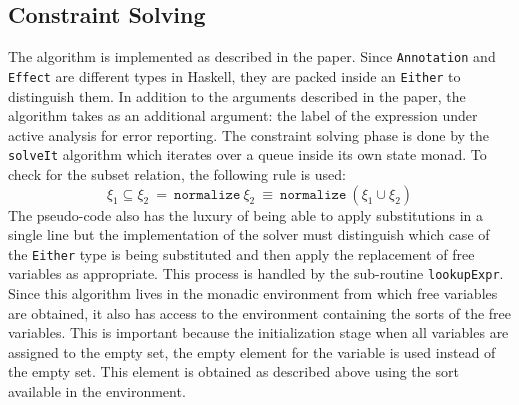 \documentclass[8pt]{extarticle}
\begin{document}
\subsection{Constraint Solving}
The algorithm is implemented as described in the paper. Since \verb+Annotation+ and \verb+Effect+ are different types in Haskell, they are packed inside an \verb+Either+ to distinguish them. In addition to the arguments described in the paper, the algorithm takes as an additional argument: the label of the expression under active analysis for error reporting. The constraint solving phase is done by the \verb+solveIt+ algorithm which iterates over a queue inside its own state monad. To check for the subset relation, the following rule is used:
\[
\xi_1\subseteq \xi_2\ =\ \mathtt{normalize}\ \xi_2\ \equiv\ \mathtt{normalize}\ \left(\xi_1\cup\xi_2\right)
\]
The pseudo-code also has the luxury of being able to apply substitutions in a single line but the implementation of the solver must distinguish which case of the \verb+Either+ type is being substituted and then apply the replacement of free variables as appropriate. This process is handled by the sub-routine \verb+lookupExpr+. Since this algorithm lives in the monadic environment from which free variables are obtained, it also has access to the environment containing the sorts of the free variables. This is important because the initialization stage when all variables are assigned to the empty set, the empty element for the variable is used instead of the empty set. This element is obtained as described above using the sort available in the environment.
\end{document}
